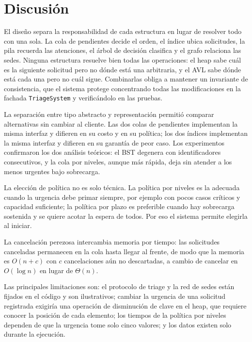 \section{Discusión}
\label{sec:discusion}

El diseño separa la responsabilidad de cada estructura en lugar de resolver
todo con una sola. La cola de pendientes decide el orden, el índice ubica
solicitudes, la pila recuerda las atenciones, el árbol de decisión
clasifica y el grafo relaciona las sedes. Ninguna estructura resuelve bien
todas las operaciones: el heap sabe cuál es la siguiente solicitud pero no
dónde está una arbitraria, y el AVL sabe dónde está cada una pero no cuál
sigue. Combinarlas obliga a mantener un invariante de consistencia, que el
sistema protege concentrando todas las modificaciones en la fachada
\texttt{TriageSystem} y verificándolo en las pruebas.

La separación entre tipo abstracto y representación permitió comparar
alternativas sin cambiar al cliente. Las dos colas de pendientes
implementan la misma interfaz y difieren en su costo y en su política; los
dos índices implementan la misma interfaz y difieren en su garantía de
peor caso. Los experimentos confirmaron los dos análisis teóricos: el BST
degenera con identificadores consecutivos, y la cola por niveles, aunque
más rápida, deja sin atender a los menos urgentes bajo sobrecarga.

La elección de política no es solo técnica. La política por niveles es la
adecuada cuando la urgencia debe primar siempre, por ejemplo con pocos
casos críticos y capacidad suficiente; la política por plazo es preferible
cuando hay sobrecarga sostenida y se quiere acotar la espera de todos. Por
eso el sistema permite elegirla al iniciar.

La cancelación perezosa intercambia memoria por tiempo: las solicitudes
canceladas permanecen en la cola hasta llegar al frente, de modo que la
memoria es $O(n + c)$ con $c$ cancelaciones aún no descartadas, a cambio de
cancelar en $O(\log n)$ en lugar de $\Theta(n)$.

Las principales limitaciones son: el protocolo de triage y la red de sedes
están fijados en el código y son ilustrativos; cambiar la urgencia de una
solicitud registrada exigiría una operación de disminución de clave en el
heap, que requiere conocer la posición de cada elemento; los tiempos de la
política por niveles dependen de que la urgencia tome solo cinco valores; y
los datos existen solo durante la ejecución.
